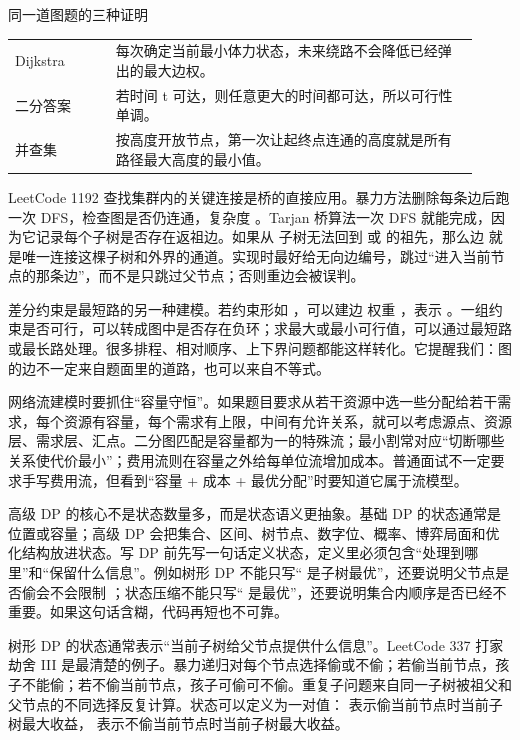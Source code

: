 \begin{principlebox}{同一道图题的三种证明}
\begin{tabular}{@{}p{0.2\linewidth}p{0.72\linewidth}@{}}
Dijkstra & 每次确定当前最小体力状态，未来绕路不会降低已经弹出的最大边权。\\
二分答案 & 若时间 t 可达，则任意更大的时间都可达，所以可行性单调。\\
并查集 & 按高度开放节点，第一次让起终点连通的高度就是所有路径最大高度的最小值。\\
\end{tabular}
\end{principlebox}

LeetCode 1192 查找集群内的关键连接是桥的直接应用。暴力方法删除每条边后跑一次 DFS，检查图是否仍连通，复杂度 。Tarjan 桥算法一次 DFS 就能完成，因为它记录每个子树是否存在返祖边。如果从  子树无法回到  或  的祖先，那么边  就是唯一连接这棵子树和外界的通道。实现时最好给无向边编号，跳过“进入当前节点的那条边”，而不是只跳过父节点；否则重边会被误判。

差分约束是最短路的另一种建模。若约束形如 ，可以建边  权重 ，表示 。一组约束是否可行，可以转成图中是否存在负环；求最大或最小可行值，可以通过最短路或最长路处理。很多排程、相对顺序、上下界问题都能这样转化。它提醒我们：图的边不一定来自题面里的道路，也可以来自不等式。

网络流建模时要抓住“容量守恒”。如果题目要求从若干资源中选一些分配给若干需求，每个资源有容量，每个需求有上限，中间有允许关系，就可以考虑源点、资源层、需求层、汇点。二分图匹配是容量都为一的特殊流；最小割常对应“切断哪些关系使代价最小”；费用流则在容量之外给每单位流增加成本。普通面试不一定要求手写费用流，但看到“容量 + 成本 + 最优分配”时要知道它属于流模型。


高级 DP 的核心不是状态数量多，而是状态语义更抽象。基础 DP 的状态通常是位置或容量；高级 DP 会把集合、区间、树节点、数字位、概率、博弈局面和优化结构放进状态。写 DP 前先写一句话定义状态，定义里必须包含“处理到哪里”和“保留什么信息”。例如树形 DP 不能只写“ 是子树最优”，还要说明父节点是否偷会不会限制 ；状态压缩不能只写“ 是最优”，还要说明集合内顺序是否已经不重要。如果这句话含糊，代码再短也不可靠。

树形 DP 的状态通常表示“当前子树给父节点提供什么信息”。LeetCode 337 打家劫舍 III 是最清楚的例子。暴力递归对每个节点选择偷或不偷；若偷当前节点，孩子不能偷；若不偷当前节点，孩子可偷可不偷。重复子问题来自同一子树被祖父和父节点的不同选择反复计算。状态可以定义为一对值： 表示偷当前节点时当前子树最大收益， 表示不偷当前节点时当前子树最大收益。


